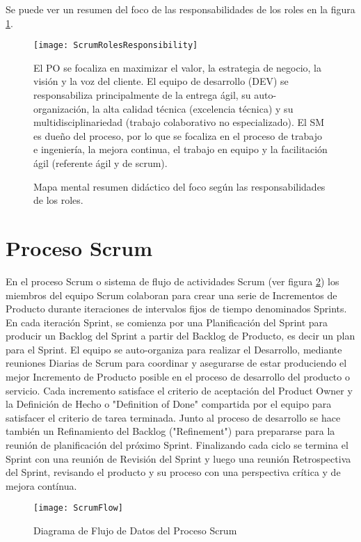 Se puede ver un resumen del foco de las responsabilidades de los roles en la figura \ref{fig:ScrumRolesResponsibility}.

\begin{figure}
  \centering
  \texttt{[image: ScrumRolesResponsibility]}
  \caption{Mapa mental resumen didáctico del foco según las responsabilidades de los roles.} El PO se focaliza en maximizar el valor, la estrategia de negocio, la visión y la voz del cliente. El equipo de desarrollo (DEV) se responsabiliza principalmente de la entrega ágil, su auto-organización, la alta calidad técnica (excelencia técnica) y su multidisciplinariedad (trabajo colaborativo no especializado). El SM es dueño del proceso, por lo que se focaliza en el proceso de trabajo e ingeniería, la mejora continua, el trabajo en equipo y la facilitación ágil (referente ágil y de scrum).
  \centering
  \label{fig:ScrumRolesResponsibility} %
\end{figure}
\FloatBarrier


\section{Proceso Scrum}

En el proceso Scrum o sistema de flujo de actividades Scrum (ver figura \ref{fig:ScrumFlow}) los miembros del equipo Scrum colaboran para crear una serie de Incrementos de Producto durante iteraciones de intervalos fijos de tiempo denominados Sprints. En cada iteración Sprint, se comienza por una Planificación del Sprint para producir un Backlog del Sprint a partir del Backlog de Producto, es decir un plan para el Sprint. El equipo se auto-organiza para realizar el Desarrollo, mediante reuniones Diarias de Scrum para coordinar y asegurarse de estar produciendo el mejor Incremento de Producto posible en el proceso de desarrollo del producto o servicio. Cada incremento satisface el criterio de aceptación del Product Owner y la Definición de Hecho o "Definition of Done" compartida por el equipo para satisfacer el criterio de tarea terminada. Junto al proceso de desarrollo se hace también un Refinamiento del Backlog ("Refinement") para prepararse para la reunión de planificación del próximo Sprint. Finalizando cada ciclo se termina el Sprint con una reunión de Revisión del Sprint y luego una reunión Retrospectiva del Sprint, revisando el producto y su proceso con una perspectiva crítica y de mejora contínua. 

\begin{figure}[h]
  \centering
  \texttt{[image: ScrumFlow]}
  \caption{Diagrama de Flujo de Datos del Proceso Scrum}
  \centering
  \label{fig:ScrumFlow} %
\end{figure}
\FloatBarrier

